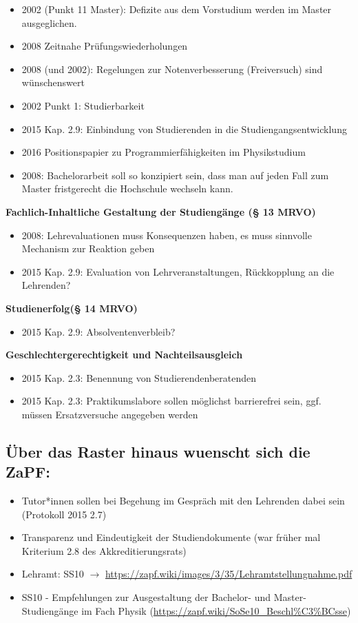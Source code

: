 \begin{itemize}
        \item 2002 (Punkt 11 Master): Defizite aus dem Vorstudium werden im Master ausgeglichen.
        \item 2008 Zeitnahe Prüfungswiederholungen
        \item 2008 (und 2002): Regelungen zur Notenverbesserung (Freiversuch) sind wünschenswert
        \item 2002 Punkt 1: Studierbarkeit
        \item 2015 Kap. 2.9: Einbindung von Studierenden in die Studiengangsentwicklung
        \item 2016 Positionspapier zu Programmierfähigkeiten im Physikstudium
        \item 2008: Bachelorarbeit soll so konzipiert sein, dass man auf jeden Fall zum Master fristgerecht die Hochschule wechseln kann.
      \end{itemize}


    \textbf{Fachlich-Inhaltliche Gestaltung der Studiengänge (§ 13 MRVO)}
      \begin{itemize}
        \item 2008: Lehrevaluationen muss Konsequenzen haben, es muss sinnvolle Mechanism zur Reaktion geben
        \item 2015 Kap. 2.9: Evaluation von Lehrveranstaltungen, Rückkopplung an die Lehrenden?
      \end{itemize}

    \textbf{Studienerfolg(§ 14 MRVO)}
      \begin{itemize}
        \item 2015 Kap. 2.9: Absolventenverbleib?
      \end{itemize}

    \textbf{Geschlechtergerechtigkeit und Nachteilsausgleich}
      \begin{itemize}
        \item 2015 Kap. 2.3: Benennung von Studierendenberatenden
        \item 2015 Kap. 2.3: Praktikumslabore sollen möglichst barrierefrei sein, ggf. müssen Ersatzversuche angegeben werden
      \end{itemize}

    \subsection{Über das Raster hinaus wuenscht sich die ZaPF:}
      \begin{itemize}
        \item Tutor*innen sollen bei Begehung im Gespräch mit den Lehrenden dabei sein (Protokoll 2015 2.7)
        \item Transparenz und Eindeutigkeit der Studiendokumente (war früher mal Kriterium 2.8 des Akkreditierungsrats)
        \item Lehramt: SS10 $\rightarrow$ \url{https://zapf.wiki/images/3/35/Lehramtstellungnahme.pdf}
        \item SS10 - Empfehlungen zur Ausgestaltung der Bachelor- und Master-Studiengänge im Fach Physik (\url{https://zapf.wiki/SoSe10_Beschl%C3%BCsse})
      \end{itemize}


